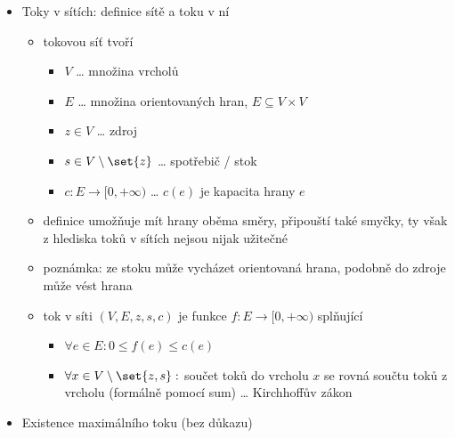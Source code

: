 \begin{itemize}
\begin{itemize}
\item vrchol je vyvážený $\equiv \text{deg}^\text{in}(v)=\text{deg}^\text{out}(v)$
\item graf je vyvážený $\equiv$ všechny vrcholy jsou vyvážené
\item součet vstupních stupňů = součet výstupních stupňů = počet hran
\item orientovaný graf je slabě souvislý $\equiv$ jeho podkladový graf je souvislý
\item o. graf je silně souvislý $\equiv$ existuje orientovaná cesta mezi každými dvěma vrcholy
\item silná souvislost $\implies$ slabá souvislost
\item věta: pro orientovaný graf $G$ platí: $G$ je vyvážený a slabě souvislý $\iff$ $G$ je eulerovský $\iff$ $G$ je vyvážený a silně souvislý
\end{itemize}
\item Toky v sítích: definice sítě a toku v ní
\begin{itemize}
\item tokovou síť tvoří
\begin{itemize}
\item $V$ \dots{} množina vrcholů
\item $E$ \dots{} množina orientovaných hran, $E\subseteq V\times V$
\item $z\in V$ \dots{} zdroj
\item $s\in V\setminus\set{z}$ \dots{} spotřebič / stok
\item $c:E\to [0,+\infty)$ \dots{} $c(e)$ je kapacita hrany $e$
\end{itemize}
\item definice umožňuje mít hrany oběma směry, připouští také smyčky, ty však z hlediska toků v sítích nejsou nijak užitečné
\item poznámka: ze stoku může vycházet orientovaná hrana, podobně do zdroje může vést hrana
\item tok v síti $(V,E,z,s,c)$ je funkce $f:E\to[0,+\infty)$ splňující
\begin{itemize}
\item $\forall e\in E:0\leq f(e)\leq c(e)$
\item $\forall x\in V\setminus \set{z,s}:$ součet toků do vrcholu $x$ se rovná součtu toků z vrcholu (formálně pomocí sum) \dots{} Kirchhoffův zákon
\end{itemize}
\end{itemize}
\item Existence maximálního toku (bez důkazu)

\end{itemize}
